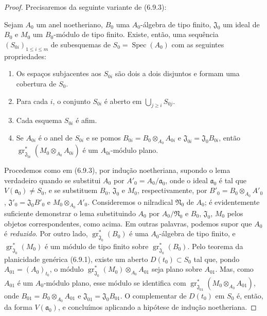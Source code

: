 \begin{proof}
Precisaremos da seguinte variante de (6.9.3):

\begin{lemma}[11.2.9.5]
\label{IV.11.2.9.5}
Sejam $A_0$ um anel noetheriano, $B_0$ uma $A_0$-álgebra de tipo finito, $\mathfrak J_0$ um ideal de $B_0$ e $M_0$ um $B_0$-módulo de tipo finito. Existe, então, uma sequência $(S_{0i})_{1\leq i\leq m}$ de subesquemas de $S_0=\operatorname{Spec}(A_0)$ com as seguintes propriedades:
\begin{enumerate}[label=\arabic{enumi}$^\circ$]
\item Os espaços subjacentes aos $S_{0i}$ são dois a dois disjuntos e formam uma cobertura de $S_0$.
\item Para cada $i$, o conjunto $S_{0i}$ é aberto em $\bigcup_{j\geq i}S_{0j}$.
\item Cada esquema $S_{0i}$ é afim.
\item Se $A_{0i}$ é o anel de $S_{0i}$ e se pomos $B_{0i}=B_0\otimes_{A_0}A_{0i}$ e $\mathfrak J_{0i}=\mathfrak J_0B_{0i}$, então $\operatorname{gr}_{\mathfrak J_{0i}}^*(M_0\otimes_{A_0}A_{0i})$ é um $A_{0i}$-módulo plano.
\end{enumerate}
\end{lemma}

Procedemos como em (6.9.3), por indução noetheriana, supondo o lema verdadeiro quando se substitui $A_0$ por $A'_0=A_0/\mathfrak a_0$, onde o ideal $\mathfrak a_0$ é tal que $V(\mathfrak a_0)\neq S_0$, e se substituem $B_0$, $\mathfrak J_0$ e $M_0$, respectivamente, por $B'_0=B_0\otimes_{A_0}A'_0$, $\mathfrak J'_0=\mathfrak J_0B'_0$ e $M_0\otimes_{A_0}A'_0$. Consideremos o nilradical $\mathfrak N_0$ de $A_0$; é evidentemente suficiente demonstrar o lema substituindo $A_0$ por $A_0/\mathfrak N_0$ e $B_0$, $\mathfrak J_0$, $M_0$ pelos objetos correspondentes, como acima. Em outras palavras, podemos supor que $A_0$ é \emph{reduzido}. Por outro lado, $\operatorname{gr}_{\mathfrak J_0}^*(B_0)$ é uma $A_0$-álgebra de tipo finito, e $\operatorname{gr}_{\mathfrak J_0}^*(M_0)$ é um módulo de tipo finito sobre $\operatorname{gr}_{\mathfrak J_0}^*(B_0)$. Pelo teorema da planicidade genérica (6.9.1), existe um aberto $D(t_0)\subset S_0$ tal que, pondo $A_{01}=(A_0)_{t_0}$, o módulo $\operatorname{gr}_{\mathfrak J_0}^*(M_0)\otimes_{A_0}A_{01}$ seja plano sobre $A_{01}$. Mas, como $A_{01}$ é um $A_0$-módulo plano, esse módulo se identifica com $\operatorname{gr}_{\mathfrak J_{01}}^*(M_0\otimes_{A_0}A_{01})$, onde $B_{01}=B_0\otimes_{A_0}A_{01}$ e $\mathfrak J_{01}=\mathfrak J_0B_{01}$. O complementar de $D(t_0)$ em $S_0$ é, então, da forma $V(\mathfrak a_0)$, e concluímos aplicando a hipótese de indução noetheriana.


\end{proof}
